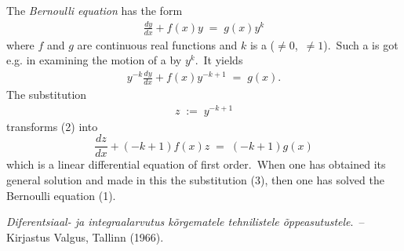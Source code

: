 \documentclass[12pt]{article}
\theoremstyle{definition}
\begin{document}
The {\em Bernoulli equation} has the form
\begin{align}
\frac{dy}{dx}+f(x)y \;=\; g(x)y^k
\end{align}
where $f$ and $g$ are continuous real functions and $k$ is a  ($\neq 0$, \,$\neq 1$).\, Such a  is got e.g. in examining the motion of a  by $y^k$.\, It yields
\begin{align}
y^{-k}\frac{dy}{dx}+f(x)y^{-k+1} \;=\; g(x).
\end{align}
The substitution
\begin{align}
z \;:=\; y^{-k+1}
\end{align}
transforms (2) into 
$$\frac{dz}{dx}+(-k\!+\!1)f(x)z \;=\; (-k\!+\!1)g(x)$$
which is a linear differential equation of first order.\, When one has obtained its general solution and made in this the substitution (3), then one has solved the Bernoulli equation (1).

\begin{thebibliography}{9}
 {\em Diferentsiaal- ja integraalarvutus k\~{o}rgematele tehnilistele \~{o}ppeasutustele}. \,-- Kirjastus Valgus, Tallinn  (1966).
\end{thebibliography}
\end{document}
